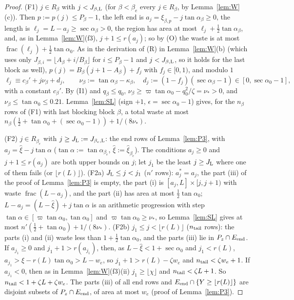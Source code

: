 \documentclass[11pt]{amsart}
\newcommand{\ta}{\tan\alpha}
\newcommand{\taz}{\tan\alpha_0}
\newcommand{\sez}{\sec\alpha_0}
\theoremstyle{definition}
\theoremstyle{remark}
\numberwithin{equation}{section}
\begin{document}
\begin{proof}
(F1) $j\in R_\beta$ with $j<J_{\beta,\rm L}$ (for $\beta<\beta_e$ every $j\in R_\beta$, by Lemma~\ref{lem:W}(c)). Then
$p:=p(j)\le P_\beta-1$, the left end is $a_j=\xi_{\beta,p}-j\tan\alpha_\beta\ge0$, the length is
$\ell_j=L-a_j\ge\sec\alpha_\beta>0$, the region has area at most $\ell_j+\frac12\tan\alpha_\beta$, and, as in
Lemma~\ref{lem:W}(f3), $j+1\le r(a_j)$; so by (O) the waste is at most
$\operatorname{frac}(\ell_j)+\frac12\taz$. As in the derivation of (R) in Lemma~\ref{lem:W}(b) (which uses only
$J_{\beta,i}=\lfloor A_\beta+i/B_\beta\rfloor$ for $i\le P_\beta-1$ and $j<J_{\beta,\rm L}$, so it holds for the last block as
well), $p(j)=B_\beta(j+1-A_\beta)+f_j$ with $f_j\in[0,1)$, and modulo $1$
\[
\ell_j\equiv c_\beta'+j\nu_\beta+d_j,\qquad \nu_\beta:=\tan\alpha_\beta-\kappa_\beta,\quad d_j:=(1-f_j)(\sec\alpha_\beta-1)\in[0,\sez-1],
\]
with a constant $c_\beta'$. By (I1) and $q_\beta\le q_0$, $\nu_\beta\ge\varpi\taz-q_0^2/\zeta=\nu_*>0$, and
$\nu_\beta\le\taz\le0.21$. Lemma~\ref{lem:SL} (sign $+1$, $\epsilon=\sez-1$) gives, for the $n_\beta$ rows of (F1) with last
blocking block $\beta$, a total waste at most $n_\beta(\frac12+\taz+(\sez-1))+1/(8\nu_*)$.

(F2) $j\in R_{\beta_e}$ with $j\ge J_{\rm L}:=J_{\beta_e,\rm L}$: the end rows of Lemma~\ref{lem:P3}, with
$a_j=\hat\xi-j\ta$ ($\ta:=\tan\alpha_{\beta_e}$, $\hat\xi:=\hat\xi_{\beta_e}$). The conditions $a_j\ge0$ and
$j+1\le r(a_j)$ are both upper bounds on $j$; let $j_1$ be the least $j\ge J_{\rm L}$ where one of them fails (or
$\lfloor r(L)\rfloor$). (F2a) $J_{\rm L}\le j<j_1$ ($n'$ rows): $a_j^*=a_j$, the part (iii) of the proof of
Lemma~\ref{lem:P3} is empty, the part (i) is $[a_j,L]\times[j,j+1)$ with waste $\operatorname{frac}(L-a_j)$, and the part (ii)
has area at most $\frac12\taz$; $L-a_j=(L-\hat\xi)+j\ta$ is an arithmetic progression with step $\ta\in[\varpi\taz,\taz]$
and $\varpi\taz\ge\nu_*$, so Lemma~\ref{lem:SL} gives at most $n'(\frac12+\taz)+1/(8\nu_*)$. (F2b) $j_1\le j<\lfloor r(L)\rfloor$
($n_{\rm tail}$ rows): the parts (i) and (ii) waste less than $1+\frac12\taz$, and the parts (iii) lie in
$P_z\cap E_{\rm end}$. If $a_{j_1}\ge0$ and $j_1+1>r(a_{j_1})$, then, as $L-\hat\xi<1+\sez$ and $j_1<r(L)$,
$a_{j_1}>\hat\xi-r(L)\taz>L-w_e$, so $j_1+1>r(L)-\zeta w_e$ and $n_{\rm tail}<\zeta w_e+1$. If $a_{j_1}<0$, then as in
Lemma~\ref{lem:W}(f3)(ii) $j_1\ge\lfloor\chi\rfloor$ and $n_{\rm tail}<\zeta L+1$. So $n_{\rm tail}<1+\zeta L+\zeta w_e$. The parts
(iii) of all end rows and $E_{\rm end}\cap\{Y\ge\lfloor r(L)\rfloor\}$ are disjoint subsets of $P_z\cap E_{\rm end}$, of area
at most $w_e$ (proof of Lemma~\ref{lem:P3}).


\end{proof}
\end{document}
